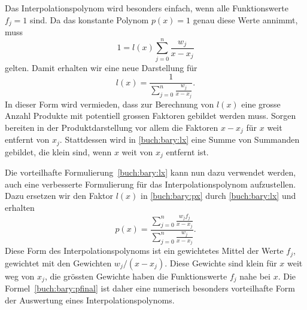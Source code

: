 Das Interpolationspolynom wird besonders einfach, wenn alle Funktionswerte
$f_j=1$ sind.
Da das konstante Polynom $p(x)=1$ genau diese Werte annimmt, muss
\[
1 = l(x) \sum_{j=0}^n \frac{w_j}{x-x_j}
\]
gelten.
Damit erhalten wir eine neue Darstellung für 
\begin{equation}
l(x)
=
\frac{1}{\displaystyle\sum_{j=0}^n \frac{w_j}{x-x_j}}.
\label{buch:bary:lx}
\end{equation}
In dieser Form wird vermieden, dass zur Berechnung von $l(x)$ eine
grosse Anzahl Produkte mit potentiell grossen Faktoren gebildet werden
muss.
Sorgen bereiten in der Produktdarstellung vor allem die Faktoren
$x-x_j$ für $x$ weit entfernt von $x_j$.
Stattdessen wird in \eqref{buch:bary:lx} eine Summe von Summanden gebildet,
die klein sind,
wenn $x$ weit von $x_j$ entfernt ist.

Die vorteilhafte Formulierung~\eqref{buch:bary:lx} kann nun dazu
verwendet werden, auch eine verbesserte Formulierung für das
Interpolationspolynom aufzustellen.
Dazu ersetzen wir den Faktor $l(x)$ in \eqref{buch:bary:px}
durch \eqref{buch:bary:lx} und erhalten
\begin{equation}
p(x)
=
\frac{\displaystyle \sum_{j=0}^n \frac{w_jf_j}{x-x_j}
}{
\displaystyle\sum_{j=0}^n \frac{w_j}{x-x_j}}.
\label{buch:bary:pfinal}
\end{equation}
Diese Form des Interpolationspolynoms ist ein gewichtetes Mittel 
der Werte $f_j$, gewichtet mit den Gewichten $w_j/(x-x_j)$.
Diese Gewichte sind klein für $x$ weit weg von $x_j$, die grössten
Gewichte haben die Funktionswerte $f_j$ nahe bei $x$.
Die Formel~\eqref{buch:bary:pfinal} ist daher eine numerisch besonders
vorteilhafte Form der Auswertung eines Interpolationspolynoms.






